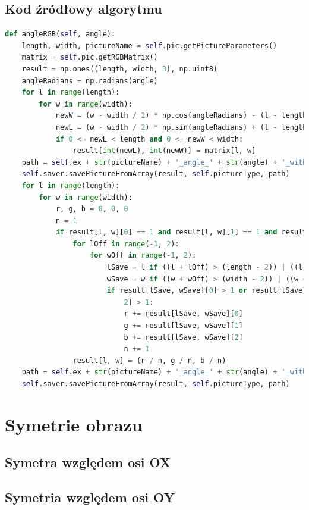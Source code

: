 \documentclass[a4paper,12pt, titlepage]{report}
\begin{document}
\subsection*{Kod źródłowy algorytmu}
\begin{lstlisting}[language=Python]
def angleRGB(self, angle):
    length, width, pictureName = self.pic.getPictureParameters()
    matrix = self.pic.getRGBMatrix()
    result = np.ones((length, width, 3), np.uint8)
    angleRadians = np.radians(angle)
    for l in range(length):
        for w in range(width):
            newW = (w - width / 2) * np.cos(angleRadians) - (l - length / 2) * np.sin(angleRadians) + (width / 2)
            newL = (w - width / 2) * np.sin(angleRadians) + (l - length / 2) * np.cos(angleRadians) + (length / 2)
            if 0 <= newL < length and 0 <= newW < width:
                result[int(newL), int(newW)] = matrix[l, w]
    path = self.ex + str(pictureName) + '_angle_' + str(angle) + '_withoutInterpolation.png'
    self.saver.savePictureFromArray(result, self.pictureType, path)
    for l in range(length):
        for w in range(width):
            r, g, b = 0, 0, 0
            n = 1
            if result[l, w][0] == 1 and result[l, w][1] == 1 and result[l, w][2] == 1:
                for lOff in range(-1, 2):
                    for wOff in range(-1, 2):
                        lSave = l if ((l + lOff) > (length - 2)) | ((l + lOff) < 0) else (l + lOff)
                        wSave = w if ((w + wOff) > (width - 2)) | ((w + wOff) < 0) else (w + wOff)
                        if result[lSave, wSave][0] > 1 or result[lSave, wSave][1] > 1 or result[lSave, wSave][
                            2] > 1:
                            r += result[lSave, wSave][0]
                            g += result[lSave, wSave][1]
                            b += result[lSave, wSave][2]
                            n += 1
                result[l, w] = (r / n, g / n, b / n)
    path = self.ex + str(pictureName) + '_angle_' + str(angle) + '_withInterpolation.png'
    self.saver.savePictureFromArray(result, self.pictureType, path)
\end{lstlisting}

\section{Symetrie obrazu}
\subsection{Symetra względem osi OX}
\subsection{Symetria względem osi OY}
\end{document}
